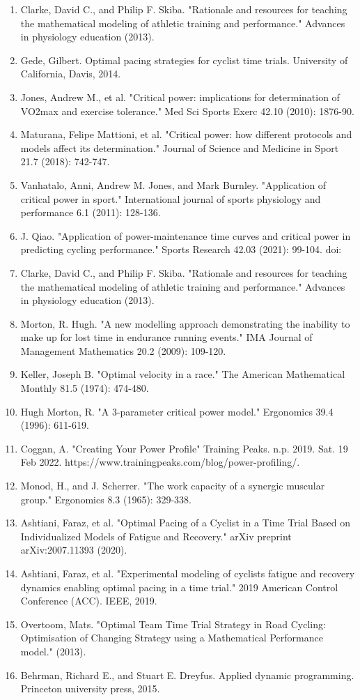 \documentclass[11pt,a4paper]{ctexart}
\begin{document}
\begin{enumerate}
\item Clarke, David C., and Philip F. Skiba. "Rationale and resources for teaching the mathematical modeling of athletic training and performance." Advances in physiology education (2013).
\item Gede, Gilbert. Optimal pacing strategies for cyclist time trials. University of California, Davis, 2014.
\item Jones, Andrew M., et al. "Critical power: implications for determination of VO2max and exercise tolerance." Med Sci Sports Exerc 42.10 (2010): 1876-90.
\item Maturana, Felipe Mattioni, et al. "Critical power: how different protocols and models affect its determination." Journal of Science and Medicine in Sport 21.7 (2018): 742-747.
\item Vanhatalo, Anni, Andrew M. Jones, and Mark Burnley. "Application of critical power in sport." International journal of sports physiology and performance 6.1 (2011): 128-136.
\item J. Qiao. "Application of power-maintenance time curves and critical power in predicting cycling performance." Sports Research 42.03 (2021): 99-104. doi:
\item Clarke, David C., and Philip F. Skiba. "Rationale and resources for teaching the mathematical modeling of athletic training and performance." Advances in physiology education (2013).
\item Morton, R. Hugh. "A new modelling approach demonstrating the inability to make up for lost time in endurance running events." IMA Journal of Management Mathematics 20.2 (2009): 109-120.
\item Keller, Joseph B. "Optimal velocity in a race." The American Mathematical Monthly 81.5 (1974): 474-480.
\item Hugh Morton, R. "A 3-parameter critical power model." Ergonomics 39.4 (1996): 611-619.
\item Coggan, A. "Creating Your Power Profile" Training Peaks. n.p. 2019. Sat. 19 Feb 2022. https://www.trainingpeaks.com/blog/power-profiling/.
\item Monod, H., and J. Scherrer. "The work capacity of a synergic muscular group." Ergonomics 8.3 (1965): 329-338.
\item Ashtiani, Faraz, et al. "Optimal Pacing of a Cyclist in a Time Trial Based on Individualized Models of Fatigue and Recovery." arXiv preprint arXiv:2007.11393 (2020).
\item Ashtiani, Faraz, et al. "Experimental modeling of cyclists fatigue and recovery dynamics enabling optimal pacing in a time trial." 2019 American Control Conference (ACC). IEEE, 2019.
\item Overtoom, Mats. "Optimal Team Time Trial Strategy in Road Cycling: Optimisation of Changing Strategy using a Mathematical Performance model." (2013).
\item Behrman, Richard E., and Stuart E. Dreyfus. Applied dynamic programming. Princeton university press, 2015.
\end{enumerate}
\end{document}
